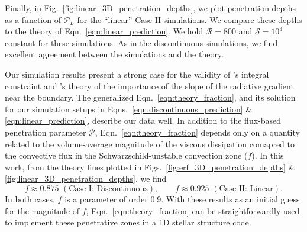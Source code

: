 \documentclass{aastex631}
\newcommand{\mP}{\ensuremath{\mathcal{P}}}
\newcommand{\mR}{\ensuremath{\mathcal{R}}}
\newcommand{\mS}{\ensuremath{\mathcal{S}}}
\begin{document}
Finally, in Fig.~\ref{fig:linear_3D_penetration_depths}, we plot penetration depths as a function of $\mP_L$ for the ``linear'' Case II simulations.
We compare these depths to the theory of Eqn.~\ref{eqn:linear_prediction}.
We hold $\mR = 800$ and $\mS = 10^3$ constant for these simulations.
As in the discontinuous simulations, we find excellent agreement between the simulations and the theory.

Our simulation results present a strong case for the validity of \citet{roxburgh1989}'s integral constraint and \citet{zahn1991}'s theory of the importance of the slope of the radiative gradient near the boundary.
The generalized Eqn.~\ref{eqn:theory_fraction}, and its solution for our simulation setups in Eqns.~\ref{eqn:discontinuous_prediction} \& \ref{eqn:linear_prediction}, describe our data well.
In addition to the flux-based penetration parameter $\mP$, Eqn.~\ref{eqn:theory_fraction} depends only on a quantity related to the volume-average magnitude of the viscous dissipation comapred to the convective flux in the Schwarzschild-unstable convection zone ($f$).
In this work, from the theory lines plotted in Figs.~\ref{fig:erf_3D_penetration_depths} \& \ref{fig:linear_3D_penetration_depths}, we find
\begin{equation}
f \approx 0.875\,\,(\text{Case I: Discontinuous}),\qquad
f \approx 0.925\,\,(\text{Case II: Linear}).
\label{eqn:fit_h_values}
\end{equation}
In both cases, $f$ is a parameter of order 0.9.
With these results as an initial guess for the magnitude of $f$, Eqn.~\ref{eqn:theory_fraction} can be straightforwardly used to implement these penetrative zones in a 1D stellar structure code.
\end{document}
